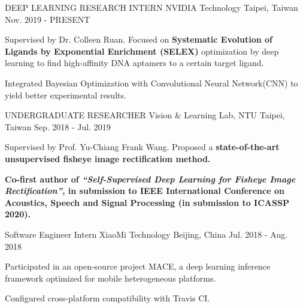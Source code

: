 

\begin{cventries}

\cventry
    {DEEP LEARNING RESEARCH INTERN} %
    {NVIDIA Technology} %
    {Taipei, Taiwan} %
    {Nov. 2019 - PRESENT} %
    {
      \begin{cvitems} %
        \item {Supervised by Dr. Colleen Ruan. Focused on \textbf{Systematic Evolution of Ligands by Exponential Enrichment (SELEX)} optimization by deep learning to find high-affinity DNA aptamers to a certain target ligand.}
        \item {Integrated Bayesian Optimization with Convolutional Neural Network(CNN) to yield better experimental results.}
      \end{cvitems}
    }

\cventry
    {UNDERGRADUATE RESEARCHER} %
    {Vision \& Learning Lab, NTU} %
    {Taipei, Taiwan} %
    {Sep. 2018 - Jul. 2019} %
    {
      \begin{cvitems} %
        \item {Supervised by Prof. Yu-Chiang Frank Wang. Proposed a \textbf{state-of-the-art unsupervised fisheye image rectification method.}}
        \item {\textbf{Co-first author of \textit{“Self-Supervised Deep Learning for Fisheye Image Rectification”}, in submission to IEEE International Conference on Acoustics, Speech and Signal Processing (in submission to ICASSP 2020).}}
      \end{cvitems}
    }



  \cventry
    {Software Engineer Intern} %
    {XiaoMi Technology} %
    {Beijing, China} %
    {Jul. 2018 - Aug. 2018} %
    {
      \begin{cvitems} %
        \item {Participated in an open-source project MACE, a deep learning inference framework optimized for mobile heterogeneous platforms.}
        \item {Configured cross-platform compatibility with Travis CI.}
      \end{cvitems}
    }

\end{cventries}
